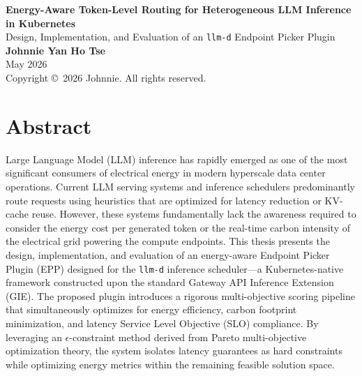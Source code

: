 \documentclass[12pt,a4paper,oneside]{report}
\begin{document}
\begin{titlepage}
    \centering
    \vspace*{2cm}
    
    {\Huge \textbf{Energy-Aware Token-Level Routing for Heterogeneous LLM Inference in Kubernetes}}\\[1.5cm]
    
    {\LARGE Design, Implementation, and Evaluation of an \texttt{llm-d} Endpoint Picker Plugin}\\[2cm]
    
    {\Large \textbf{Johnnie Yan Ho Tse}}\\[2cm]
    
    
    
    {\large May 2026}\\[1cm]
    
    {\small Copyright \copyright\ 2026 Johnnie. All rights reserved.}
    
    \vfill
\end{titlepage}


\chapter*{Abstract}
Large Language Model (LLM) inference has rapidly emerged as one of the most significant consumers of electrical energy in modern hyperscale data center operations. Current LLM serving systems and inference schedulers predominantly route requests using heuristics that are optimized for latency reduction or KV-cache reuse. However, these systems fundamentally lack the awareness required to consider the energy cost per generated token or the real-time carbon intensity of the electrical grid powering the compute endpoints. This thesis presents the design, implementation, and evaluation of an energy-aware Endpoint Picker Plugin (EPP) designed for the \texttt{llm-d} inference scheduler---a Kubernetes-native framework constructed upon the standard Gateway API Inference Extension (GIE). The proposed plugin introduces a rigorous multi-objective scoring pipeline that simultaneously optimizes for energy efficiency, carbon footprint minimization, and latency Service Level Objective (SLO) compliance. By leveraging an \(\epsilon\)-constraint method derived from Pareto multi-objective optimization theory, the system isolates latency guarantees as hard constraints while optimizing energy metrics within the remaining feasible solution space.
\end{document}
